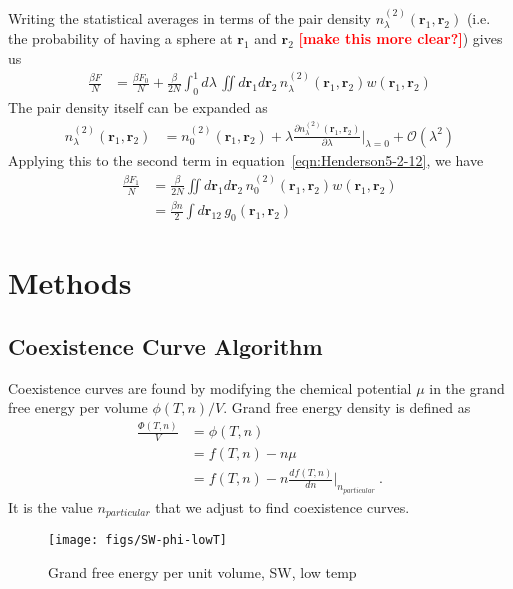 \documentclass[letterpaper,twocolumn,amsmath,amssymb,prb]{revtex4-1}
\newcommand{\npart}{\ensuremath{n_{particular}}}
\newcommand{\1}{\ensuremath{\textbf{r}_1}}
\newcommand{\2}{\ensuremath{\textbf{r}_2}}
\newcommand{\fixme}[1]{\textcolor{red}{\textbf{[#1]}}}
\begin{document}
Writing the statistical averages in terms of the pair density $n_\lambda^{(2)}(\1,\2)$ (i.e. the probability of having a sphere at \1 and \2 \fixme{make this more clear?}) gives us
\begin{align}
  \frac{\beta F}{N} &= \frac{\beta F_0}{N} + \frac{\beta}{2N}\int_0^1 d\lambda\, \iint d\1 d\2\, n_\lambda^{(2)}(\1,\2)w(\1,\2) \label{eqn:Henderson5-2-12}
\end{align}
The pair density itself can be expanded as
\begin{align}
  n_\lambda^{(2)}(\1,\2) &= n_0^{(2)}(\1,\2) + \lambda\frac{\partial n_\lambda^{(2)}(\1,\2)}{\partial\lambda}\bigg|_{\lambda = 0} + \mathcal{O}(\lambda^2)
\end{align}
Applying this to the second term in equation~\ref{eqn:Henderson5-2-12}, we have
\begin{align}
  \frac{\beta F_1}{N} &= \frac{\beta}{2N}\iint d\1 d\2\, n_0^{(2)}(\1,\2)w(\1,\2) \\
  &= \frac{\beta n}{2}\int d\mathbf{r}_{12}\, g_0(\1,\2)
\end{align}

\section{Methods}\label{sec:methods}

\subsection{Coexistence Curve Algorithm}\label{subsec:coexis}
Coexistence curves are found by modifying the chemical potential $\mu$
in the grand free energy per volume $\phi(T,n)/V$. Grand free energy
density is defined as
\begin{align}
  \frac{\Phi(T,n)}{V} &= \phi(T,n) \nonumber \\
                 &= f(T,n) - n\mu \nonumber \\
                 &= f(T,n) - n\frac{df(T,n)}{dn}\bigg|_{\npart}\ .
\end{align}
It is the value $\npart$ that we adjust to find coexistence curves.

\begin{figure}
  \centering
  \texttt{[image: figs/SW-phi-lowT]}
  \caption{Grand free energy per unit volume, SW, low temp}
  \label{fig:SW-phi-lowT}
\end{figure}
\end{document}
